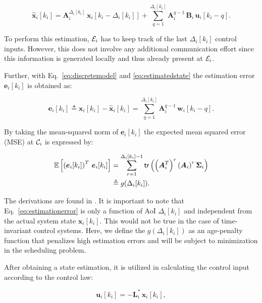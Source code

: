 \begin{equation}
  \label{eq:estimatedstate}
    \boldsymbol{\hat{x}}_i[k_i] = \boldsymbol{A}_i^{\Delta_i[k_i]} \,  \boldsymbol{x}_i[k_i - \Delta_i[k_i]] + \sum_{q=1}^{\Delta_i[k_i]} \boldsymbol{A}_i^{q - 1} \, \boldsymbol{B}_i \, \boldsymbol{u}_i [k_i - q].
\end{equation}

To perform this estimation, $\mathcal{E}_i$ has to keep track of the last
$\Delta_i[k_i]$ control inputs. However, this does not involve any additional
communication effort since this information is generated locally and thus
already present at $\mathcal{E}_i$.

Further, with Eq.~\eqref{eq:discretemodel} and \eqref{eq:estimatedstate} the
estimation error $\boldsymbol{e}_i[k_i]$ is obtained as:

\begin{equation}
  \boldsymbol{e}_i[k_i] \triangleq \boldsymbol{x}_i[k_i] - \boldsymbol{\hat{x}}_i[k_i] = \sum_{q=1}^{\Delta_i[k_i]} \boldsymbol{A}_i^{q-1} \, \boldsymbol{w}_i[k_i - q].
\end{equation}

By taking the mean-squared norm of $\boldsymbol{e}_i[k_i]$ the expected mean
squared error (MSE) at $\mathcal{C}_i$ is expressed by:

\begin{align}
  \label{eq:estimationerror}
  \mathbb{E} \left[ \left(\boldsymbol{e}_i[k_i]\right)^T \, \boldsymbol{e}_i[k_i]\right] & = \sum_{r=1}^{\Delta_i[k_i] - 1} \mathsf{tr} \left( \left(\boldsymbol{A}_i^T\right)^r  \left(\boldsymbol{A}_i \right)^r \boldsymbol{\Sigma}_i \right) \\ \nonumber
  & \triangleq g(\Delta_i[k_i]).
\end{align}

The derivations are found in \cite{ayan2019age}. It is important to note that
Eq.~\eqref{eq:estimationerror} is only a function of AoI $\Delta_i[k_i]$ and
independent from the actual system state $\boldsymbol{x}_i[k_i]$. This would not
be true in the case of time-invariant control systems. Here, we define the
$g(\Delta_i[k_i])$ as an age-penalty function that penalizes high estimation
errors and will be subject to minimization in the scheduling problem. 

After obtaining a state estimation, it is utilized in calculating the control
input according to the control law:

\begin{equation}
  \label{eq:controllaw}
  \boldsymbol{u}_i[k_i] = - \boldsymbol{L}_i^* \,\boldsymbol{\hat{x}}_i[k_i],
\end{equation}


